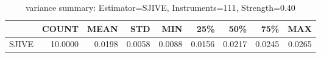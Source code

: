 \begin{table}[ht]
\centering
\caption{variance summary: Estimator=SJIVE, Instruments=111, Strength=0.40}
\begin{tabular}{lrrrrrrrr}
\toprule
 & COUNT & MEAN & STD & MIN & 25\% & 50\% & 75\% & MAX \\
\midrule
SJIVE & 10.0000 & 0.0198 & 0.0058 & 0.0088 & 0.0156 & 0.0217 & 0.0245 & 0.0265 \\
\bottomrule
\end{tabular}
\end{table}
